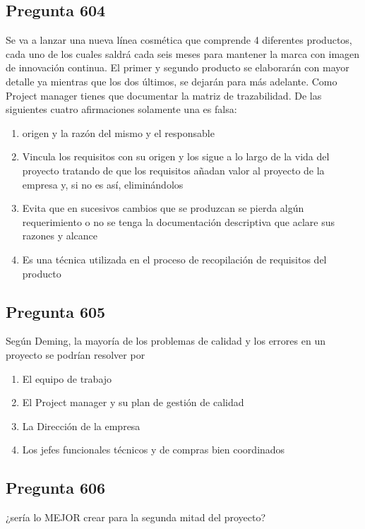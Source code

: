 \documentclass[11pt,a4paper]{article}
\begin{document}
\subsection*{Pregunta 604}
Se va a lanzar una nueva línea cosmética que comprende 4 diferentes productos, cada uno de los cuales saldrá cada seis meses para mantener la marca con imagen de innovación continua. El primer y segundo producto se elaborarán con mayor detalle ya mientras que los dos últimos, se dejarán para más adelante. Como Project manager tienes que documentar la matriz de trazabilidad. De las siguientes cuatro afirmaciones solamente una es falsa:

\begin{enumerate}[label=\alph*)]
  \item origen y la razón del mismo y el responsable
  \item Vincula los requisitos con su origen y los sigue a lo largo de la vida del proyecto tratando de que los requisitos añadan valor al proyecto de la empresa y, si no es así, eliminándolos
  \item Evita que en sucesivos cambios que se produzcan se pierda algún requerimiento o no se tenga la documentación descriptiva que aclare sus razones y alcance
  \item Es una técnica utilizada en el proceso de recopilación de requisitos del producto
\end{enumerate}

\subsection*{Pregunta 605}
Según Deming, la mayoría de los problemas de calidad y los errores en un proyecto se podrían resolver por

\begin{enumerate}[label=\alph*)]
  \item El equipo de trabajo
  \item El Project manager y su plan de gestión de calidad
  \item La Dirección de la empresa
  \item Los jefes funcionales técnicos y de compras bien coordinados
\end{enumerate}

\subsection*{Pregunta 606}
¿sería lo MEJOR crear para la segunda mitad del proyecto?
\end{document}
